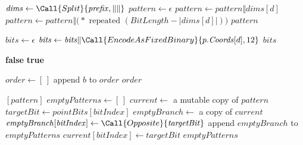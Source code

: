 \begin{algorithm}[t]
\begin{algorithmic}[1]
    \State $\mathit{dims} \gets \Call{Split}{\mathit{prefix}, \mathbin{\| \|}}$
    \State $\mathit{pattern} \gets \epsilon$
        \State $\mathit{pattern} \gets \mathit{pattern} \Vert \mathit{dims}[d]$
        \State $\mathit{pattern} \gets \mathit{pattern} \Vert \bigl(\ast \text{ repeated } (\mathit{BitLength} - |\mathit{dims}[d]|)\bigr)$
    \EndFor
    \State \Return $\mathit{pattern}$
\EndProcedure
\end{algorithmic}
\end{algorithm}

\begin{algorithm}[t]
\caption{Point encoding and ordered subtraction}
\begin{algorithmic}[1]
    \State $\mathit{bits} \gets \epsilon$
        \State $\mathit{bits} \gets \mathit{bits} \Vert \Call{EncodeAsFixedBinary}{p.\mathit{Coords}[d], 12}$
    \EndFor
    \State \Return $\mathit{bits}$
\EndProcedure

            \State \Return \textbf{false}
        \EndIf
    \EndFor
    \State \Return \textbf{true}
\EndProcedure

    \State $\mathit{order} \gets [\,]$
            \State append $b$ to $\mathit{order}$
        \EndFor
    \EndFor
    \State \Return $\mathit{order}$
\EndProcedure

        \State \Return $[\mathit{pattern}]$
    \EndIf
    \State $\mathit{emptyPatterns} \gets [\,]$
    \State $\mathit{current} \gets$ a mutable copy of $\mathit{pattern}$
            \State $\mathit{targetBit} \gets \mathit{pointBits}[\mathit{bitIndex}]$
            \State $\mathit{emptyBranch} \gets$ a copy of $\mathit{current}$
            \State $\mathit{emptyBranch}[\mathit{bitIndex}] \gets \Call{Opposite}{\mathit{targetBit}}$
            \State append $\mathit{emptyBranch}$ to $\mathit{emptyPatterns}$
            \State $\mathit{current}[\mathit{bitIndex}] \gets \mathit{targetBit}$
        \EndIf
    \EndFor
    \State \Return $\mathit{emptyPatterns}$
\EndProcedure


\end{algorithmic}
\end{algorithm}
